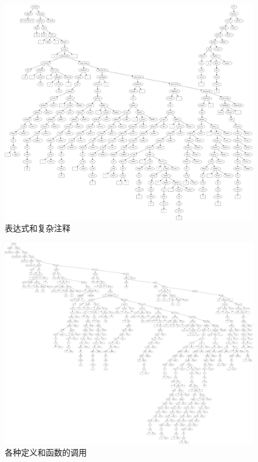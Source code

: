 \documentclass[supercite]{Experimental_Report}
\theoremstyle{definition}
\begin{document}
\newpage
\begin{figure}[htb]
	\begin{center}
		\includegraphics[scale=0.15]{images/表达式和复杂注释.png}
		\caption{表达式和复杂注释}
		\label{fig3-2}
	\end{center}
\end{figure}
\newpage
\begin{figure}[htb]
	\begin{center}
		\includegraphics[scale=0.09]{images/各种定义和函数的调用.png}
		\caption{各种定义和函数的调用}
		\label{fig3-3}
	\end{center}
\end{figure}
\newpage
\end{document}
